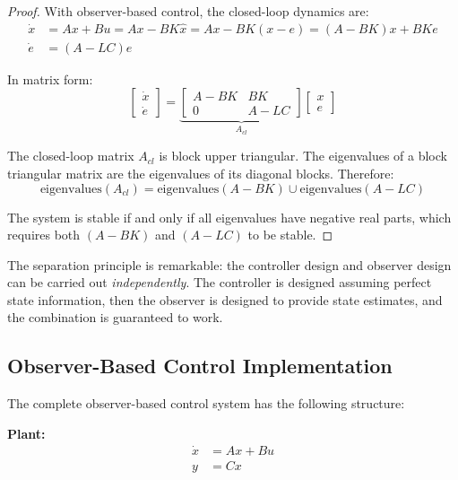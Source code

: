 \begin{proof}
With observer-based control, the closed-loop dynamics are:
\begin{align}
\dot{x} &= Ax + Bu = Ax - BK\hat{x} = Ax - BK(x - e) = (A-BK)x + BKe \\
\dot{e} &= (A-LC)e
\end{align}

In matrix form:
\begin{equation}
\begin{bmatrix} \dot{x} \\ \dot{e} \end{bmatrix} = \underbrace{\begin{bmatrix} A-BK & BK \\ 0 & A-LC \end{bmatrix}}_{A_{cl}} \begin{bmatrix} x \\ e \end{bmatrix}
\label{eq:separation_principle}
\end{equation}

The closed-loop matrix $A_{cl}$ is block upper triangular. The eigenvalues of a block triangular matrix are the eigenvalues of its diagonal blocks. Therefore:
\begin{equation}
\text{eigenvalues}(A_{cl}) = \text{eigenvalues}(A-BK) \cup \text{eigenvalues}(A-LC)
\end{equation}

The system is stable if and only if all eigenvalues have negative real parts, which requires both $(A-BK)$ and $(A-LC)$ to be stable.
\end{proof}

The separation principle is remarkable: the controller design and observer design can be carried out \textit{independently}. The controller is designed assuming perfect state information, then the observer is designed to provide state estimates, and the combination is guaranteed to work.

\subsection{Observer-Based Control Implementation}

The complete observer-based control system has the following structure:

\textbf{Plant:}
\begin{align}
\dot{x} &= Ax + Bu \\
y &= Cx
\end{align}


